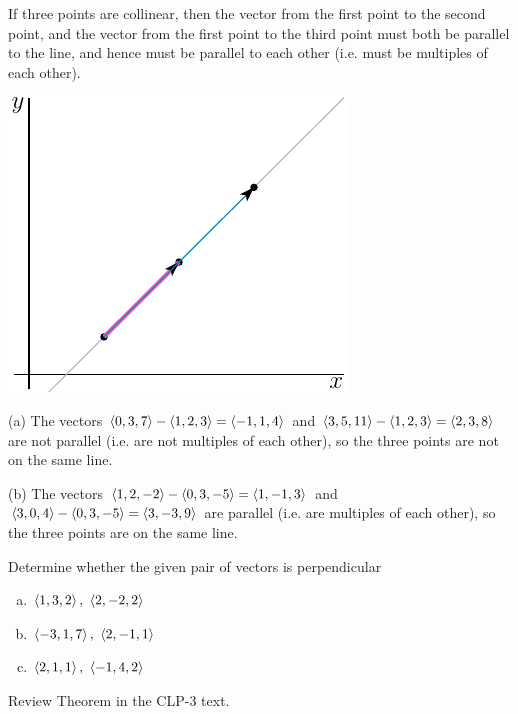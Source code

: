 \begin{solution}
If three points are collinear, then the vector from the first point
to the second point, and the vector from the first point to the third point 
must both be parallel to the line, and hence must be parallel to each other
(i.e. must be multiples of each other).

\begin{center}
     \includegraphics{fig/collinear.pdf}
\end{center}

(a)
The vectors $\left< 0,3,7\right> -\left< 1,2,3\right> =\left< -1,1,4\right> $ and $\left< 3,5,11\right> -\left< 1,2,3\right> =\left< 2,3,8\right> $ 
are not parallel (i.e. are not multiples of each other),
so the three points are not on the same line.

(b)
The vectors $\left< 1,2,-2\right> -\left< 0,3,-5\right> =\left< 1,-1,3\right> $ and
$\left< 3,0,4\right> -\left< 0,3,-5\right> =\left< 3,-3,9\right> $ are parallel (i.e. are  multiples of each other),
so the three points are on the same line.
\end{solution}

\begin{question}
Determine whether the given pair of vectors is perpendicular
\begin{enumerate}[(a)]
\item
$\left< 1,3,2\right> ,\ \left< 2,-2,2\right> $ 
\item
$\left< -3,1,7\right> ,\ \left< 2,-1,1\right> $ 
\item
$\left< 2,1,1\right> ,\ \left< -1,4,2\right> $ 
\end{enumerate}
\end{question}

\begin{hint}
Review Theorem  in the CLP-3 text.
\end{hint}

